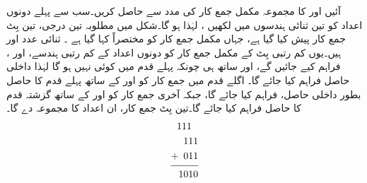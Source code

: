 آئیں   اور  کا مجموعہ  مکمل جمع کار کی مدد  سے حاصل کریں۔سب سے پہلے دونوں اعداد کو تین ثنائی ہندسوں میں لکھیں ،  لہٰذا  ہو گا۔شکل   میں مطلوبہ   تین درجی، تین   بِٹ  جمع کار پیش کیا گیا ہے، جہاں مکمل جمع کار کو مختصراً  کہا گیا ہے ۔ ثنائی عدد  اور    ہیں۔یوں کم رتبی  بِٹ  کے  مکمل جمع کار کو دونوں اعداد کے کم  رتبی ہندسے،  اور ،  فراہم کیے جائیں گے،   اور ساتھ ہی چونکہ پہلے قدم میں کوئی   نہیں ہو گا لہٰذا  داخلی حاصل  فراہم کیا جائے گا۔ اگلے قدم میں  جمع کار کو  اور  کے ساتھ پہلے قدم کا حاصل  بطور داخلی حاصل،  فراہم کیا جائے گا،  جبکہ آخری جمع کار کو  اور   کے ساتھ گزشتہ قدم کا حاصل  فراہم کیا جائے گا۔تین بِٹ جمع کار، ان اعداد کا مجموعہ    دے گا۔
\begin{align*}
\begin{split}
111\phantom{1\,}&\\
\phantom{1}111&\\
+\phantom{1}011&\\
\noalign{\smallskip}\hline\noalign{\smallskip}
1010&
\end{split}
\end{align*}
%
